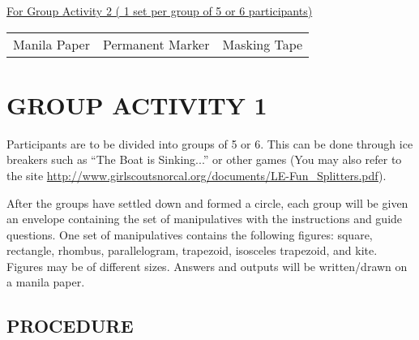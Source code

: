 \underline{For Group Activity 2 ( 1 set per group of 5 or 6 participants)}

\begin{tabular}{lll}
Manila Paper & Permanent Marker & Masking Tape \\
\end{tabular}

\section*{GROUP ACTIVITY 1}
Participants are to be divided into groups of 5 or 6. This can be done through ice
breakers such as “The Boat is Sinking...” or other games (You may also refer to the site
\url{http://www.girlscoutsnorcal.org/documents/LE-Fun_Splitters.pdf}).

After the groups have settled down and formed a circle, each group will be given an
envelope containing the set of manipulatives with the instructions and guide questions. One set
of manipulatives contains the following figures: square, rectangle, rhombus, parallelogram,
trapezoid, isosceles trapezoid, and kite. Figures may be of different sizes. Answers and outputs
will be written/drawn on a manila paper.

\subsection*{PROCEDURE}

